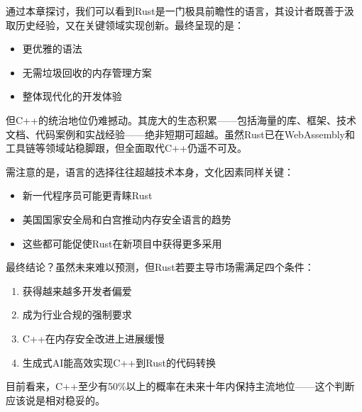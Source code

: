 通过本章探讨，我们可以看到Rust是一门极具前瞻性的语言，其设计者既善于汲取历史经验，又在关键领域实现创新。最终呈现的是：

\begin{itemize}
\item 
更优雅的语法

\item 
无需垃圾回收的内存管理方案

\item 
整体现代化的开发体验
\end{itemize}

但C++的统治地位仍难撼动。其庞大的生态积累——包括海量的库、框架、技术文档、代码案例和实战经验——绝非短期可超越。虽然Rust已在WebAssembly和工具链等领域站稳脚跟，但全面取代C++仍遥不可及。

需注意的是，语言的选择往往超越技术本身，文化因素同样关键：

\begin{itemize}
\item 
新一代程序员可能更青睐Rust

\item 
美国国家安全局和白宫推动内存安全语言的趋势

\item 
这些都可能促使Rust在新项目中获得更多采用
\end{itemize}

最终结论？虽然未来难以预测，但Rust若要主导市场需满足四个条件：

\begin{enumerate}
\item 
获得越来越多开发者偏爱

\item 
成为行业合规的强制要求

\item 
C++在内存安全改进上进展缓慢

\item 
生成式AI能高效实现C++到Rust的代码转换
\end{enumerate}

目前看来，C++至少有50\%以上的概率在未来十年内保持主流地位——这个判断应该说是相对稳妥的。

